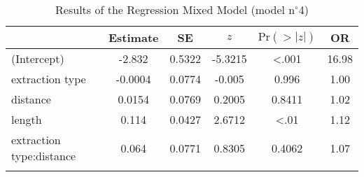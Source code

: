 \begin{table}
\begin{tabular}{l S[table-format=-1.4] S[table-format=1.4] S[table-format=-1.4] S[table-format=<1.4] S[table-format=2.2]}
  \lsptoprule
 & {Estimate} & {SE} & {$z$} & {$\text{Pr}(>|z|)$} & {OR} \\ 
  \midrule
(Intercept) & -2.832 & 0.5322 & -5.3215 & <.001 & 16.98 \\ 
  extraction type & -0.0004 & 0.0774 & -0.005 & 0.996 & 1.00 \\ 
  distance & 0.0154 & 0.0769 & 0.2005 & 0.8411 & 1.02 \\ 
  length & 0.114 & 0.0427 & 2.6712 & <.01 & 1.12 \\ 
  extraction type:distance & 0.064 & 0.0771 & 0.8305 & 0.4062 & 1.07 \\ 
   \lspbottomrule
\end{tabular}
\caption{Results of the Regression Mixed Model (model n$^{\circ}$4)}
\label{tab:exp03-m4}
\end{table}
